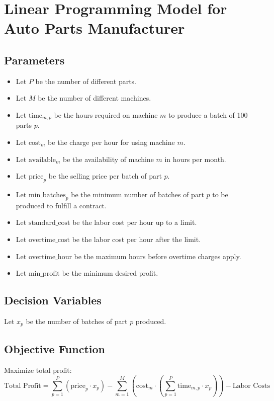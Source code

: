 \documentclass{article}
\begin{document}
\section*{Linear Programming Model for Auto Parts Manufacturer}

\subsection*{Parameters}
\begin{itemize}
    \item Let \( P \) be the number of different parts.
    \item Let \( M \) be the number of different machines.
    \item Let \( \text{time}_{m,p} \) be the hours required on machine \( m \) to produce a batch of 100 parts \( p \).
    \item Let \( \text{cost}_{m} \) be the charge per hour for using machine \( m \).
    \item Let \( \text{available}_{m} \) be the availability of machine \( m \) in hours per month.
    \item Let \( \text{price}_{p} \) be the selling price per batch of part \( p \).
    \item Let \( \text{min\_batches}_{p} \) be the minimum number of batches of part \( p \) to be produced to fulfill a contract.
    \item Let \( \text{standard\_cost} \) be the labor cost per hour up to a limit.
    \item Let \( \text{overtime\_cost} \) be the labor cost per hour after the limit.
    \item Let \( \text{overtime\_hour} \) be the maximum hours before overtime charges apply.
    \item Let \( \text{min\_profit} \) be the minimum desired profit.
\end{itemize}

\subsection*{Decision Variables}
Let \( x_{p} \) be the number of batches of part \( p \) produced.

\subsection*{Objective Function}
Maximize total profit:
\[
\text{Total Profit} = \sum_{p=1}^{P} \left( \text{price}_{p} \cdot x_{p} \right) - \sum_{m=1}^{M} \left( \text{cost}_{m} \cdot \left( \sum_{p=1}^{P} \text{time}_{m,p} \cdot x_{p} \right) \right) - \text{Labor Costs}
\]
\end{document}
